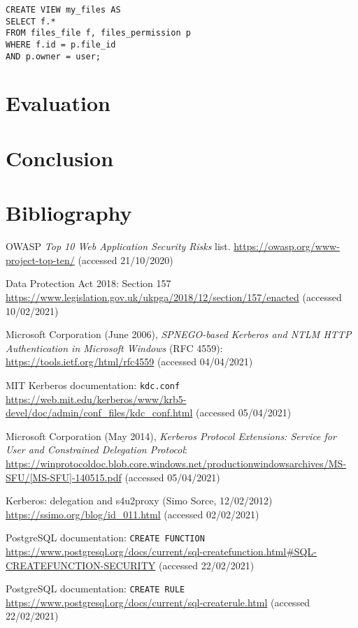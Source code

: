 \documentclass{article}
\begin{document}
\begin{verbatim}
CREATE VIEW my_files AS
SELECT f.*
FROM files_file f, files_permission p
WHERE f.id = p.file_id
AND p.owner = user;
\end{verbatim}

\section{Evaluation}

\section{Conclusion}

\section*{Bibliography}
\begin{thebibliography}{9}
 OWASP \textit{Top 10 Web Application Security Risks} list. \url{https://owasp.org/www-project-top-ten/} (accessed 21/10/2020)

 Data Protection Act 2018: Section 157 \url{https://www.legislation.gov.uk/ukpga/2018/12/section/157/enacted} (accessed 10/02/2021)

 Microsoft Corporation (June 2006), \textit{SPNEGO-based Kerberos and NTLM HTTP Authentication in Microsoft Windows} (RFC 4559): \url{https://tools.ietf.org/html/rfc4559} (accessed 04/04/2021)

 MIT Kerberos documentation: \texttt{kdc.conf} \url{https://web.mit.edu/kerberos/www/krb5-devel/doc/admin/conf_files/kdc_conf.html} (accessed 05/04/2021)

 Microsoft Corporation (May 2014), \textit{Kerberos Protocol Extensions: Service for User and Constrained Delegation Protocol}: \url{https://winprotocoldoc.blob.core.windows.net/productionwindowsarchives/MS-SFU/[MS-SFU]-140515.pdf} (accessed 05/04/2021)

  Kerberos: delegation and s4u2proxy (Simo Sorce, 12/02/2012) \url{https://ssimo.org/blog/id_011.html} (accessed 02/02/2021)

 PostgreSQL documentation: \texttt{CREATE FUNCTION} \url{https://www.postgresql.org/docs/current/sql-createfunction.html#SQL-CREATEFUNCTION-SECURITY} (accessed 22/02/2021)

 PostgreSQL documentation: \texttt{CREATE RULE} \url{https://www.postgresql.org/docs/current/sql-createrule.html} (accessed 22/02/2021)

\end{thebibliography}
\end{document}
